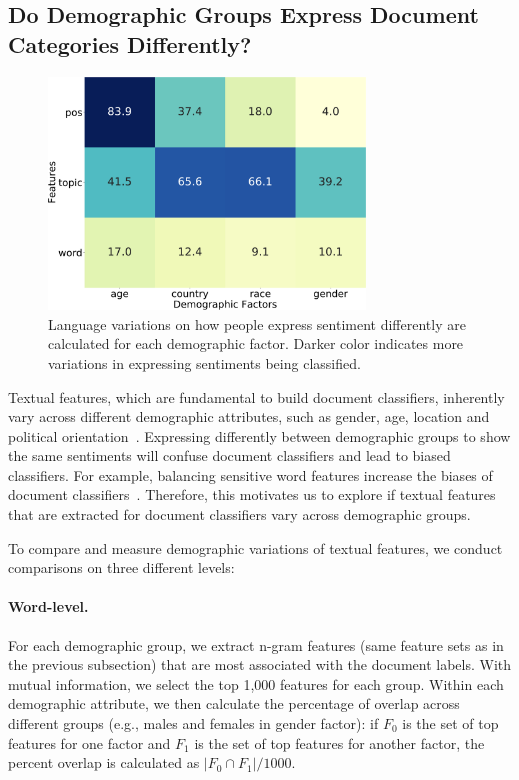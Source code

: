 \subsection{Do Demographic Groups Express Document Categories Differently?}

\begin{figure}[tb!]
\centering
\includegraphics[width=0.75\textwidth]{images/chapter5/overlaps.pdf}
\caption{Language variations on how people express sentiment differently are calculated for each demographic factor. Darker color indicates more variations in expressing sentiments being classified.}
\label{chap5:fig:overlaps}
\end{figure}

Textual features, which are fundamental to build document classifiers, inherently vary across different demographic attributes, such as gender, age, location and political orientation~\cite{gao2015more, hinds2018demographic}.
Expressing differently between demographic groups to show the same sentiments will confuse document classifiers and lead to biased classifiers.
For example, balancing sensitive word features increase the biases of document classifiers~\cite{dixon2018measuring}.
Therefore, this motivates us to explore if textual features that are extracted for document classifiers vary across demographic groups.

To compare and measure demographic variations of textual features, we conduct comparisons on three different levels:

\paragraph{Word-level.} For each demographic group, we extract n-gram features (same feature sets as in the previous subsection) that are most associated with the document labels. With mutual information, we select the top 1,000 features for each group. Within each demographic attribute, we then calculate the percentage of overlap across different groups (e.g., males and females in gender factor): if $F_0$ is the set of top features for one factor and $F_1$ is the set of top features for another factor, the percent overlap is calculated as $|F_0 \cap F_1|/1000$.

